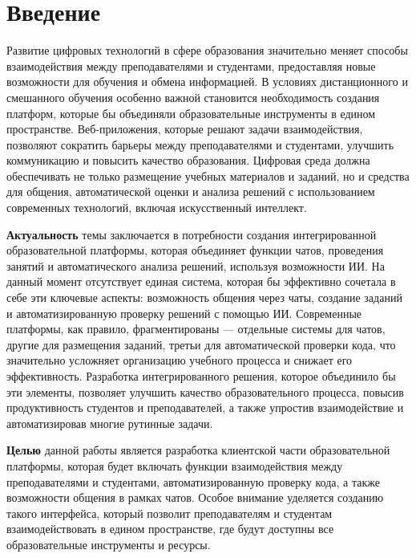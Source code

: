 \newpage
{}
\section{Введение}

Развитие цифровых технологий в сфере образования значительно меняет способы взаимодействия между преподавателями и студентами, предоставляя новые возможности для обучения и обмена информацией. В условиях дистанционного и смешанного обучения особенно важной становится необходимость создания платформ, которые бы объединяли образовательные инструменты в едином пространстве. Веб-приложения, которые решают задачи взаимодействия, позволяют сократить барьеры между преподавателями и студентами, улучшить коммуникацию и повысить качество образования. Цифровая среда должна обеспечивать не только размещение учебных материалов и заданий, но и средства для общения, автоматической оценки и анализа решений с использованием современных технологий, включая искусственный интеллект.

\textbf{Актуальность} темы заключается в потребности создания интегрированной образовательной платформы, которая объединяет функции чатов, проведения занятий и автоматического анализа решений, используя возможности ИИ. На данный момент отсутствует единая система, которая бы эффективно сочетала в себе эти ключевые аспекты: возможность общения через чаты, создание заданий и автоматизированную проверку решений с помощью ИИ. Современные платформы, как правило, фрагментированы — отдельные системы для чатов, другие для размещения заданий, третьи для автоматической проверки кода, что значительно усложняет организацию учебного процесса и снижает его эффективность. Разработка интегрированного решения, которое объединило бы эти элементы, позволяет улучшить качество образовательного процесса, повысив продуктивность студентов и преподавателей, а также упростив взаимодействие и автоматизировав многие рутинные задачи.

\textbf{Целью} данной работы является разработка клиентской части образовательной платформы, которая будет включать функции взаимодействия между преподавателями и студентами, автоматизированную проверку кода, а также возможности общения в рамках чатов. Особое внимание уделяется созданию такого интерфейса, который позволит преподавателям и студентам взаимодействовать в едином пространстве, где будут доступны все образовательные инструменты и ресурсы.

